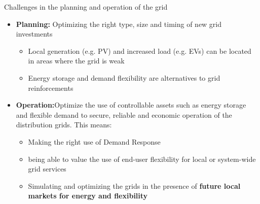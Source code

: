 \documentclass{beamer}
\begin{document}
\begin{frame}{Challenges in the planning and operation of the grid}
\begin{itemize}
\item<1-> \textbf{Planning:} Optimizing the right type, size and timing of new grid investments
\begin{itemize}
\item Local generation (e.g. PV) and increased load (e.g. EVs)  can be located in areas where the grid is weak
\item Energy storage and demand flexibility are alternatives to grid reinforcements
\end{itemize}

\item<2-> \textbf{Operation:}Optimize the use of controllable assets such as energy storage and flexible demand to secure, reliable and economic operation of the distribution grids. This means:
\begin{itemize}
\item Making the right use of Demand Response
\item being able to value the use of end-user flexibility for local or system-wide grid services
\item Simulating and optimizing the grids in the presence of \textbf{future local markets for energy and flexibility}
\end{itemize}
\end{itemize}
\end{frame}
\end{document}
